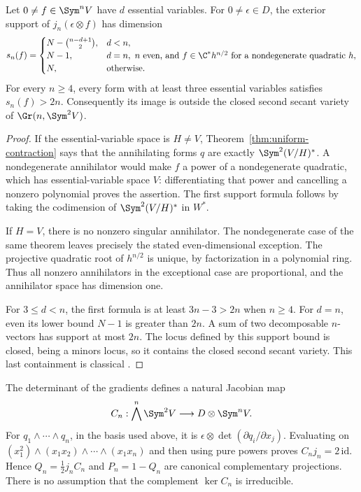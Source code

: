 \begin{theorem}
\label{thm:uniform-support-table}
Let \(0\ne f\in\Sym^nV\) have \(d\) essential variables.
For \(0\ne\epsilon\in D\), the exterior support of
\(j_n(\epsilon\otimes f)\) has dimension
\begin{equation}\label{eq:uniform-support-table}
 s_n(f)=
 \begin{cases}
 N-\binom{n-d+1}{2},&d<n,\\
 N-1,&d=n,\ n\text{ even, and }f\in\C^*h^{n/2}
                         \text{ for a nondegenerate quadratic }h,\\
 N,&\text{otherwise}.
 \end{cases}
\end{equation}
For every \(n\ge4\), every form with at least three essential
variables satisfies \(s_n(f)>2n\).  Consequently its image is
outside the closed second secant variety of \(\Gr(n,\Sym^2V)\).
\end{theorem}
\begin{proof}
If the essential-variable space is \(H\ne V\),
Theorem~\ref{thm:uniform-contraction} says that the annihilating
forms \(q\) are exactly \(\Sym^2(V/H)^*\).  A nondegenerate
annihilator would make \(f\) a power of a nondegenerate quadratic,
which has essential-variable space \(V\): differentiating that
power and cancelling a nonzero polynomial proves the assertion.
The first support formula follows by taking the codimension of
\(\Sym^2(V/H)^*\) in \(W^*\).

If \(H=V\), there is no nonzero singular annihilator.  The
nondegenerate case of the same theorem leaves precisely the stated
even-dimensional exception.  The projective quadratic root of
\(h^{n/2}\) is unique, by factorization in a polynomial ring.
Thus all nonzero annihilators in the exceptional case are proportional,
and the annihilator space has dimension one.

For \(3\le d<n\), the first formula is at least \(3n-3>2n\)
when \(n\ge4\).  For \(d=n\), even its lower bound \(N-1\)
is greater than \(2n\).  A sum of two decomposable \(n\)-vectors
has support at most \(2n\).  The locus defined by this support bound
is closed, being a minors locus, so it contains the closed second
secant variety.  This last containment is classical
\cite[\S6.1]{LandsbergOttaviani2010}\cite[\S10.1]{LandsbergOttaviani}.
\end{proof}

The determinant of the gradients defines a natural Jacobian map
\[
 C_n:\bigwedge^n\Sym^2V\longrightarrow D\otimes\Sym^nV.
\]
For \(q_1\wedge\cdots\wedge q_n\), in the basis used above, it is
\(\epsilon\otimes\det(\partial q_i/\partial x_j)\).
Evaluating on \((x_1^2)\wedge(x_1x_2)\wedge\cdots\wedge(x_1x_n)\)
and then using pure powers proves \(C_nj_n=2\,\mathrm{id}\).
Hence \(Q_n=\frac12j_nC_n\) and \(P_n=1-Q_n\) are canonical
complementary projections.  There is no assumption that the
complement \(\ker C_n\) is irreducible.

